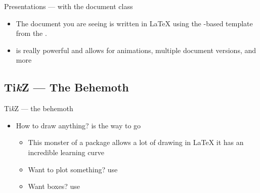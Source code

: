 \begin{frame}{Presentations --- with the \BeamerCls document class}
   \begin{itemize}
      \item The document you are seeing is written in \LaTeX{} using the \BeamerCls-based template from the .
      \item \BeamerCls is really powerful and allows for animations, multiple document versions, and more\medskip
   \end{itemize}
\end{frame}

\subsection{Ti\textit{k}Z --- The Behemoth}


\begin{frame}{Ti\textit{k}Z --- the behemoth}
   \begin{itemize}
      \item How to draw anything? \TikzPkg is the way to go \begin{itemize}
         \item This monster of a package allows a lot of drawing in \LaTeX{} it has an incredible learning curve
         \item Want to plot something? use \PgfplotsPkg
         \item Want boxes? use \TcolorboxPkg
      \end{itemize}
   \end{itemize}
\end{frame}

